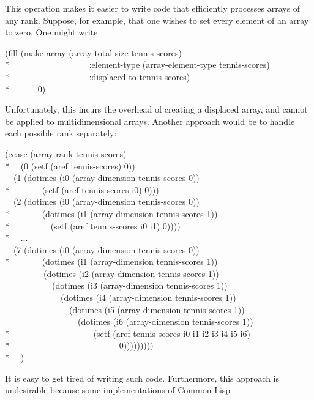 \begin{defun}[Function]
This operation makes it easier to write code that efficiently processes
arrays of any rank.  Suppose, for example, that one wishes to set every
element of an array  to zero.  One might write
\begin{lisp}
(fill (make-array (array-total-size tennis-scores) \\*
~~~~~~~~~~~~~~~~~~:element-type (array-element-type tennis-scores) \\*
~~~~~~~~~~~~~~~~~~:displaced-to tennis-scores) \\*
~~~~~~0)
\end{lisp}
Unfortunately, this incurs the overhead of creating a displaced array,
and  cannot be applied to multidimensional arrays.
Another approach would be to handle each possible rank separately:
\begin{lisp}
(ecase (array-rank tennis-scores) \\*
~~(0 (setf (aref tennis-scores) 0)) \\
~~(1 (dotimes (i0 (array-dimension tennis-scores 0)) \\*
~~~~~~~(setf (aref tennis-scores i0) 0))) \\
~~(2 (dotimes (i0 (array-dimension tennis-scores 0)) \\*
~~~~~~~(dotimes (i1 (array-dimension tennis-scores 1)) \\*
~~~~~~~~~(setf (aref tennis-scores i0 i1) 0)))) \\*
~~... \\
~~(7 (dotimes (i0 (array-dimension tennis-scores 0)) \\*
~~~~~~~(dotimes (i1 (array-dimension tennis-scores 1)) \\
~~~~~~~~~(dotimes (i2 (array-dimension tennis-scores 1)) \\
~~~~~~~~~~~(dotimes (i3 (array-dimension tennis-scores 1)) \\
~~~~~~~~~~~~~(dotimes (i4 (array-dimension tennis-scores 1)) \\
~~~~~~~~~~~~~~~(dotimes (i5 (array-dimension tennis-scores 1)) \\
~~~~~~~~~~~~~~~~~(dotimes (i6 (array-dimension tennis-scores 1)) \\*
~~~~~~~~~~~~~~~~~~~(setf (aref tennis-scores i0 i1 i2 i3 i4 i5 i6) \\*
~~~~~~~~~~~~~~~~~~~~~~~~~0))))))))) \\*
~~)
\end{lisp}
It is easy to get tired of writing such code.  Furthermore, this approach
is undesirable because some implementations of Common Lisp

\end{defun}
